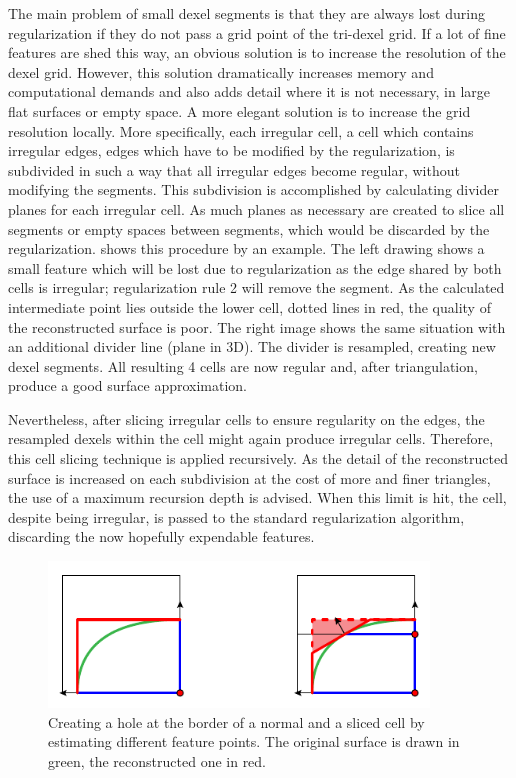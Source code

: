 The main problem of small dexel segments is that they are always lost during regularization if they do not pass a grid point of the tri-dexel grid.
If a lot of fine features are shed this way, an obvious solution is to increase the resolution of the dexel grid.
However, this solution dramatically increases memory and computational demands and also adds detail where it is not necessary, \eg in large flat surfaces or empty space.
A more elegant solution is to increase the grid resolution locally.
More specifically, each irregular cell, \ie a cell which contains irregular edges, \ie edges which have to be modified by the regularization, is subdivided in such a way that all irregular edges become regular, without modifying the segments.
This subdivision is accomplished by calculating divider planes for each irregular cell.
As much planes as necessary are created to slice all segments or empty spaces between segments, which would be discarded by the regularization.
 shows this procedure by an example.
The left drawing shows a small feature which will be lost due to regularization as the edge shared by both cells is irregular; regularization rule 2 will remove the segment.
As the calculated intermediate point lies outside the lower cell, \cf dotted lines in red, the quality of the reconstructed surface is poor.
The right image shows the same situation with an additional divider line (plane in 3D).
The divider is resampled, creating new dexel segments.
All resulting 4 cells are now regular and, after triangulation, produce a good surface approximation.

Nevertheless, after slicing irregular cells to ensure regularity on the edges, the resampled dexels within the cell might again produce irregular cells.
Therefore, this cell slicing technique is applied recursively.
As the detail of the reconstructed surface is increased on each subdivision at the cost of more and finer triangles, the use of a maximum recursion depth is advised.
When this limit is hit, the cell, despite being irregular, is passed to the standard regularization algorithm, discarding the now hopefully expendable features.

\begin{figure}
	\centering
	\includegraphics[width=0.9\textwidth]{images/tri_dexel_hole_creation}
	\caption{
		Creating a hole at the border of a normal and a sliced cell by estimating different feature points.
		The original surface is drawn in green, the reconstructed one in red.
	}
	\label{fig:tri_dexel_hole_creation}
\end{figure}

